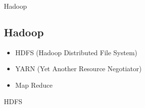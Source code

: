 \documentclass[11pt]{beamer}
\begin{document}
\begin{frame}{Hadoop}
\subsection{Hadoop}
\begin{center}
\begin{figure}
\end{figure}
\end{center}
\begin{itemize}
	\item HDFS (Hadoop Distributed File System)
	\item YARN (Yet Another Resource Negotiator)
	\item Map Reduce
\end{itemize}
\end{frame}

\begin{frame}{HDFS}
\begin{figure}
\end{figure}
\end{frame}
\end{document}
